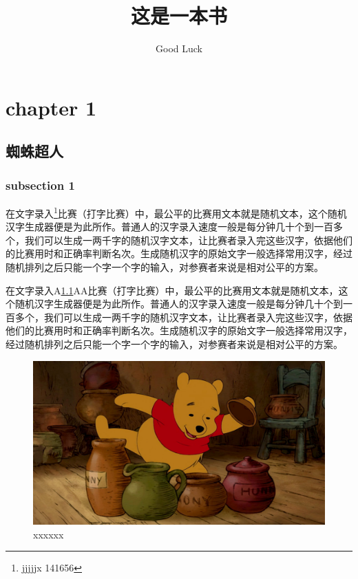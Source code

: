 \documentclass[12pt,hyperref,UTF8]{ctexbook}
\title{这是一本书}                              %
\author{Good Luck}                              %
\begin{document}
\frontmatter
\pagestyle{empty}                 %
\maketitle                        %

\cleardoublepage
\pagestyle{headings}              %
\tableofcontents                  %

\mainmatter
\cleardoublepage
%
%
\chapter{chapter 1}
\section{蜘蛛超人}
\label{testsection}

\subsection{subsection 1}

在文字录入\footnote{jjjjjx 141656}比赛（打字比赛）中，最公平的比赛用文本就是随机文本，这个随机汉字生成器便是为此所作。普通人的汉字录入速度一般是每分钟几十个到一百多个，我们可以生成一两千字的随机汉字文本，让比赛者录入完这些汉字，依据他们的比赛用时和正确率判断名次。生成随机汉字的原始文字一般选择常用汉字，经过随机排列之后只能一个字一个字的输入，对参赛者来说是相对公平的方案。

在文字录入A\ref{testsection}A\pageref{testsection}A比赛（打字比赛）中，最公平的比赛用文本就是随机文本，这个随机汉字生成器便是为此所作。普通人的汉字录入速度一般是每分钟几十个到一百多个，我们可以生成一两千字的随机汉字文本，让比赛者录入完这些汉字，依据他们的比赛用时和正确率判断名次。生成随机汉字的原始文字一般选择常用汉字，经过随机排列之后只能一个字一个字的输入，对参赛者来说是相对公平的方案。

\begin{figure}[ht]
\centering
\includegraphics[width=\textwidth]{0000.jpg}
\caption{xxxxxx}
\label{xxxxxx1}
\end{figure}
\end{document}
